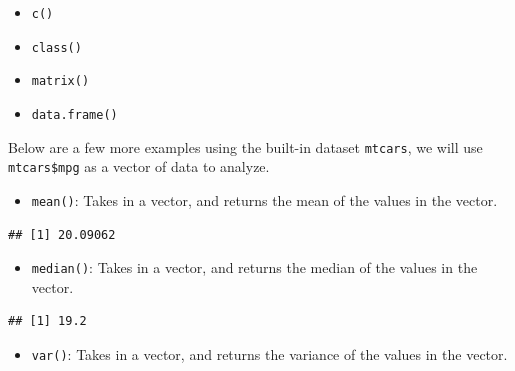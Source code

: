 \documentclass[
]{book}
\newenvironment{Shaded}{\begin{snugshade}}{\end{snugshade}}
\newcommand{\KeywordTok}[1]{\textcolor[rgb]{0.13,0.29,0.53}{\textbf{#1}}}
\newcommand{\NormalTok}[1]{#1}
\newcommand{\OperatorTok}[1]{\textcolor[rgb]{0.81,0.36,0.00}{\textbf{#1}}}
\providecommand{\tightlist}{%
  \setlength{\itemsep}{0pt}\setlength{\parskip}{0pt}}
\begin{document}
\begin{itemize}
\tightlist
\item
  \texttt{c()}
\item
  \texttt{class()}
\item
  \texttt{matrix()}
\item
  \texttt{data.frame()}
\end{itemize}

Below are a few more examples using the built-in dataset \texttt{mtcars}, we will use \texttt{mtcars\$mpg} as a vector of data to analyze.

\begin{itemize}
\tightlist
\item
  \texttt{mean()}: Takes in a vector, and returns the mean of the values in the vector.
\end{itemize}

\begin{Shaded}
\end{Shaded}

\begin{verbatim}
## [1] 20.09062
\end{verbatim}

\begin{itemize}
\tightlist
\item
  \texttt{median()}: Takes in a vector, and returns the median of the values in the vector.
\end{itemize}

\begin{Shaded}
\end{Shaded}

\begin{verbatim}
## [1] 19.2
\end{verbatim}

\begin{itemize}
\tightlist
\item
  \texttt{var()}: Takes in a vector, and returns the variance of the values in the vector.
\end{itemize}

\begin{Shaded}
\end{Shaded}
\end{document}
